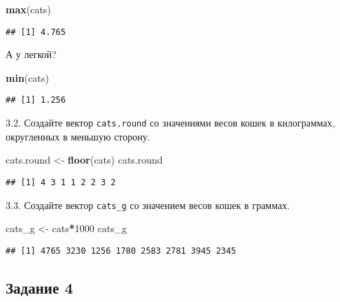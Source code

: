 \documentclass[
]{article}
\newenvironment{Shaded}{\begin{snugshade}}{\end{snugshade}}
\newcommand{\DecValTok}[1]{\textcolor[rgb]{0.00,0.00,0.81}{#1}}
\newcommand{\KeywordTok}[1]{\textcolor[rgb]{0.13,0.29,0.53}{\textbf{#1}}}
\newcommand{\NormalTok}[1]{#1}
\newcommand{\OperatorTok}[1]{\textcolor[rgb]{0.81,0.36,0.00}{\textbf{#1}}}
\newcommand{\StringTok}[1]{\textcolor[rgb]{0.31,0.60,0.02}{#1}}
\begin{document}
\begin{Shaded}
\begin{Highlighting}[]
\KeywordTok{max}\NormalTok{(cats)}
\end{Highlighting}
\end{Shaded}

\begin{verbatim}
## [1] 4.765
\end{verbatim}

А у легкой?

\begin{Shaded}
\begin{Highlighting}[]
\KeywordTok{min}\NormalTok{(cats)}
\end{Highlighting}
\end{Shaded}

\begin{verbatim}
## [1] 1.256
\end{verbatim}

3.2. Создайте вектор \texttt{cats.round} со значениями весов кошек в
килограммах, округленных в меньшую сторону.

\begin{Shaded}
\begin{Highlighting}[]
\NormalTok{cats.round <-}\StringTok{ }\KeywordTok{floor}\NormalTok{(cats)}
\NormalTok{cats.round}
\end{Highlighting}
\end{Shaded}

\begin{verbatim}
## [1] 4 3 1 1 2 2 3 2
\end{verbatim}

3.3. Создайте вектор \texttt{cats\_g} со значением весов кошек в
граммах.

\begin{Shaded}
\begin{Highlighting}[]
\NormalTok{cats_g <-}\StringTok{ }\NormalTok{cats}\OperatorTok{*}\DecValTok{1000}
\NormalTok{cats_g}
\end{Highlighting}
\end{Shaded}

\begin{verbatim}
## [1] 4765 3230 1256 1780 2583 2781 3945 2345
\end{verbatim}

\hypertarget{ux437ux430ux434ux430ux43dux438ux435-4}{%
\subsection{Задание 4}\label{ux437ux430ux434ux430ux43dux438ux435-4}}
\end{document}
